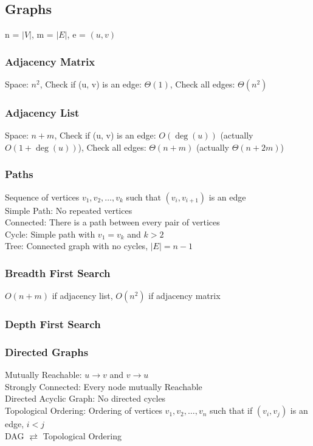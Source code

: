 \documentclass{article}
\begin{document}
\begin{multicols*}{2}
        \subsection*{Graphs}
        n = $\rvert V \lvert$, m = $\rvert E \lvert$, e = $(u, v)$
        \subsubsection*{Adjacency Matrix}
        Space: $n^2$, Check if (u, v) is an edge: $\Theta(1)$, Check all edges: $\Theta(n^2)$
        \subsubsection*{Adjacency List}
        Space: $n + m$, Check if (u, v) is an edge: $O(\deg(u))$ (actually $O(1 + \deg(u))$), Check
        all edges: $\Theta(n + m)$ (actually $\Theta(n + 2m)$)
        \subsubsection*{Paths}
        Sequence of vertices $v_1, v_2, \dots, v_k$ such that $(v_i, v_{i+1})$ is an edge\\
        Simple Path: No repeated vertices\\
        Connected: There is a path between every pair of vertices\\
        Cycle: Simple path with $v_1 = v_k$ and $k > 2$\\
        Tree: Connected graph with no cycles, $\lvert E \rvert = n - 1$
        \subsubsection*{Breadth First Search}
        $O(n + m)$ if adjacency list, $O(n^2)$ if adjacency matrix
        \subsubsection*{Depth First Search}
        \subsubsection*{Directed Graphs}
        Mutually Reachable: $u \to v$ and $v \to u$\\
        Strongly Connected: Every node mutually Reachable\\
        Directed Acyclic Graph: No directed cycles\\
        Topological Ordering: Ordering of vertices $v_1, v_2, \ldots, v_n$ such that if $(v_i,
        v_j)$ is an edge, $i < j$\\
        DAG $\rightleftarrows$ Topological Ordering

\end{multicols*}
\end{document}
